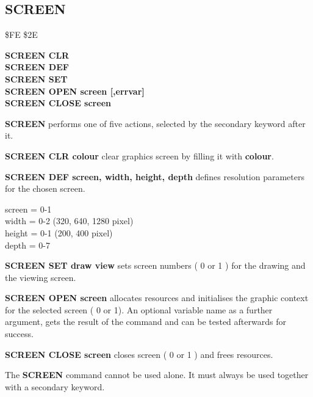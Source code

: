 \subsection{SCREEN}
\begin{description}[leftmargin=2cm,style=nextline]
\item [Token:] \$FE \$2E
\item [Format:] {\bf SCREEN CLR} \\
                {\bf SCREEN DEF} \\
                {\bf SCREEN SET} \\
                {\bf SCREEN OPEN screen [,errvar]} \\
                {\bf SCREEN CLOSE screen}

\item [Usage:] {\bf SCREEN} performs one of five actions,
               selected by the secondary keyword after it.

                {\bf SCREEN CLR colour} clear graphics screen
                by filling it with {\bf colour}.

                {\bf SCREEN DEF screen, width, height, depth}
                defines resolution parameters for the chosen
                screen.

                screen = 0-1 \\
                width = 0-2 (320, 640, 1280 pixel) \\
                height = 0-1 (200, 400 pixel) \\
                depth = 0-7

                {\bf SCREEN SET draw view} sets screen numbers
                ( 0 or 1 ) for the drawing and the viewing screen.

                {\bf SCREEN OPEN screen} allocates resources and
                initialises the graphic context for the selected
                screen ( 0 or 1). An optional variable name as
                a further argument, gets the result of the
                command and can be tested afterwards for success.

                {\bf SCREEN CLOSE screen } closes screen
                ( 0 or 1 ) and frees resources.

\item [Remarks:] The {\bf SCREEN} command cannot be used alone.
               It must always be used together with a secondary keyword.


\end{description}
